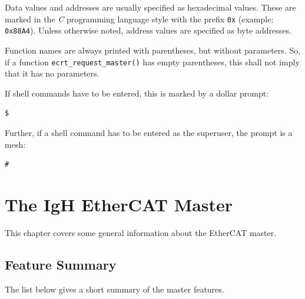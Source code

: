 \documentclass[a4paper,12pt,BCOR=6mm,bibtotoc,idxtotoc]{scrbook}
\begin{document}
Data values and addresses are usually specified as hexadecimal values. These
are marked in the \textit{C} programming language style with the prefix
\lstinline+0x+ (example: \lstinline+0x88A4+). Unless otherwise noted, address
values are specified as byte addresses.

Function names are always printed with parentheses, but without
parameters. So, if a function \lstinline+ecrt_request_master()+ has
empty parentheses, this shall not imply that it has no parameters.

If shell commands have to be entered, this is marked by a dollar prompt:

\begin{lstlisting}
$
\end{lstlisting}

Further, if a shell command has to be entered as the superuser, the
prompt is a mesh:

\begin{lstlisting}
#
\end{lstlisting}


\chapter{The IgH EtherCAT Master}
\label{chapter:master}

This chapter covers some general information about the EtherCAT master.


\section{Feature Summary}
\label{sec:summary}

The list below gives a short summary of the master features.
\end{document}
